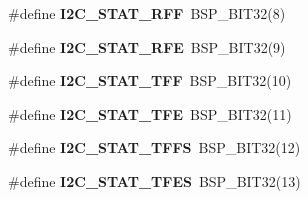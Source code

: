 \begin{DoxyCompactItemize}
\#define {\bfseries I2\+C\+\_\+\+S\+T\+A\+T\+\_\+\+R\+FF}~B\+S\+P\+\_\+\+B\+I\+T32(8)
\item 
\mbox{\label{group__lpc32xx__i2c_ga2d05f007ff0230fc314d299df351f930}} 
\#define {\bfseries I2\+C\+\_\+\+S\+T\+A\+T\+\_\+\+R\+FE}~B\+S\+P\+\_\+\+B\+I\+T32(9)
\item 
\mbox{\label{group__lpc32xx__i2c_ga473061ddc0b615cc5ce9ee4f276bc022}} 
\#define {\bfseries I2\+C\+\_\+\+S\+T\+A\+T\+\_\+\+T\+FF}~B\+S\+P\+\_\+\+B\+I\+T32(10)
\item 
\mbox{\label{group__lpc32xx__i2c_gab9d489ac48f278ba979ea29cddd33d9f}} 
\#define {\bfseries I2\+C\+\_\+\+S\+T\+A\+T\+\_\+\+T\+FE}~B\+S\+P\+\_\+\+B\+I\+T32(11)
\item 
\mbox{\label{group__lpc32xx__i2c_gaad7d02bcead4cc3528e8ea34328458c1}} 
\#define {\bfseries I2\+C\+\_\+\+S\+T\+A\+T\+\_\+\+T\+F\+FS}~B\+S\+P\+\_\+\+B\+I\+T32(12)
\item 
\mbox{\label{group__lpc32xx__i2c_ga3382e687fb01ec5863bc54f9f1888450}} 
\#define {\bfseries I2\+C\+\_\+\+S\+T\+A\+T\+\_\+\+T\+F\+ES}~B\+S\+P\+\_\+\+B\+I\+T32(13)
\end{DoxyCompactItemize}
